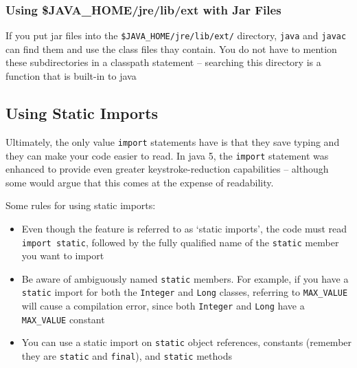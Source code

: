 \subsubsection{Using \$JAVA_HOME/jre/lib/ext with Jar Files}
If you put jar files into the \verb#$JAVA_HOME/jre/lib/ext/# directory, 
\verb#java# and \verb#javac# can find them and use the class files thay 
contain. You do not have to mention these subdirectories in a classpath 
statement -- searching this directory is a function that is built-in to java

\subsection{Using Static Imports}
Ultimately, the only value \verb#import# statements have is that they save 
typing and they can make your code easier to read. In java 5, the \verb#import# 
statement was enhanced to provide even greater keystroke-reduction capabilities 
-- although some would argue that this comes at the expense of readability.

Some rules for using static imports:
\begin{itemize}
    \item Even though the feature is referred to as `static imports', the code 
    must read \verb#import static#, followed by the fully qualified name of the 
    \verb#static# member you want to import
    \item Be aware of ambiguously named \verb#static# members. For example, if 
    you have a \verb#static# import for both the \verb#Integer# and \verb#Long# 
    classes, referring to \verb#MAX_VALUE# will cause a compilation error, 
    since both \verb#Integer# and \verb#Long# have a \verb#MAX_VALUE# constant
    \item You can use a static import on \verb#static# object references, 
    constants (remember they are \verb#static# and \verb#final#), and 
    \verb#static# methods
\end{itemize}
